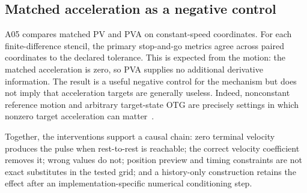 \subsection{Matched acceleration as a negative control}

A05 compares matched PV and PVA on constant-speed coordinates. For each finite-difference stencil, the primary stop-and-go metrics agree across \PVAPVEquivalentCoordinateCount{} paired coordinates to the declared tolerance. This is expected from the motion: the matched acceleration is zero, so PVA supplies no additional derivative information. The result is a useful negative control for the mechanism but does not imply that acceleration targets are generally useless. Indeed, nonconstant reference motion and arbitrary target-state OTG are precisely settings in which nonzero target acceleration can matter~\cite{berscheid2021ruckig}.

Together, the interventions support a causal chain: zero terminal velocity produces the pulse when rest-to-rest is reachable; the correct velocity coefficient removes it; wrong values do not; position preview and timing constraints are not exact substitutes in the tested grid; and a history-only construction retains the effect after an implementation-specific numerical conditioning step.
